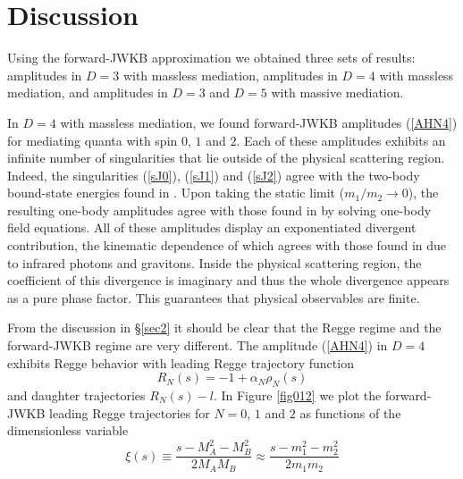 \section{Discussion}
Using the forward-JWKB approximation we obtained three sets of results: amplitudes in $D = 3$ with massless mediation, amplitudes in $D = 4$ with massless mediation, and amplitudes in $D = 3$ and $D = 5$ with massive mediation.

In $D = 4$ with massless mediation, we found forward-JWKB amplitudes (\ref{AHN4}) for mediating quanta with spin $0$, $1$ and $2$. Each of these amplitudes exhibits an infinite number of singularities that lie outside of the physical scattering region. Indeed, the singularities (\ref{sJ0}), (\ref{sJ1}) and (\ref{sJ2}) agree with the two-body bound-state energies found in \cite{BIZJ,KabatOrtiz,Dittrich}. Upon taking the static limit ($m_{1} / m_{2} \rightarrow 0$), the resulting one-body amplitudes agree with those found in \cite{Singh} by solving one-body field equations. All of these amplitudes display an exponentiated divergent contribution, the kinematic dependence of which agrees with those found in \cite{Weinberg:1965nx} due to infrared photons and gravitons. Inside the physical scattering region, the coefficient of this divergence is imaginary and thus the whole divergence appears as a pure phase factor. This guarantees that physical observables are finite.

From the discussion in \S\ref{sec2} it should be clear that the Regge regime and the forward-JWKB regime are very different. The amplitude (\ref{AHN4}) in $D = 4$ exhibits Regge behavior with leading Regge trajectory function
\begin{equation}
	R_{N}(s) = -1 + \alpha_{N} \rho_{N}(s)
\end{equation}
and daughter trajectories $R_{N}(s) - l$. In Figure \ref{fig012} we plot the forward-JWKB leading Regge trajectories for $N = 0$, $1$ and $2$ as functions of the dimensionless variable
\begin{equation}
	\xi(s) \equiv \frac{s - M_{A}^{2} - M_{B}^{2}}{2 M_{A} M_{B}} \approx \frac{s - m_{1}^{2} - m_{2}^{2}}{2 m_{1} m_{2}}
\end{equation}

